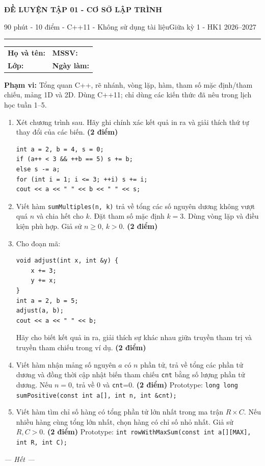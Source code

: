 \documentclass[11pt,a4paper]{article}
\newcommand{\examtitle}[4]{\begin{center}{\Large\bfseries\color{hcmusblue}#1}\par\vspace{3pt}{\large\bfseries #2}\par\vspace{3pt}\small #3\quad\textbullet\quad #4\end{center}\vspace{5pt}\hrule\vspace{8pt}}
\newcommand{\studentline}{\begin{tabularx}{\textwidth}{X X}\textbf{Họ và tên:} \hrulefill & \textbf{MSSV:} \hrulefill\\[7pt]\textbf{Lớp:} \hrulefill & \textbf{Ngày làm:} \hrulefill\end{tabularx}\vspace{8pt}}
\newcommand{\points}[1]{\hfill\textbf{(#1 điểm)}}
\begin{document}
\examtitle{ĐỀ LUYỆN TẬP 01 - CƠ SỞ LẬP TRÌNH}{CƠ SỞ LẬP TRÌNH - HCMUS (theo lịch học tuần 1--5)}{90 phút - 10 điểm - C++11 - Không sử dụng tài liệu}{Giữa kỳ 1 - HK1 2026--2027}

\studentline
\begin{notebox}\textbf{Phạm vi:} Tổng quan C++, rẽ nhánh, vòng lặp, hàm, tham số mặc định/tham chiếu, mảng 1D và 2D. Dùng C++11; chỉ dùng các kiến thức đã nêu trong lịch học tuần 1--5.\end{notebox}
\begin{enumerate}
\item Xét chương trình sau. Hãy ghi chính xác kết quả in ra và giải thích thứ tự thay đổi của các biến. \points{2}
\begin{lstlisting}
int a = 2, b = 4, s = 0;
if (a++ < 3 && ++b == 5) s += b;
else s -= a;
for (int i = 1; i <= 3; ++i) s += i;
cout << a << " " << b << " " << s;
\end{lstlisting}
\item Viết hàm \texttt{sumMultiples(n, k)} trả về tổng các số nguyên dương không vượt quá $n$ và chia hết cho $k$. Đặt tham số mặc định $k=3$. Dùng vòng lặp và điều kiện phù hợp. Giả sử $n\ge0$, $k>0$. \points{2}
\item Cho đoạn mã:
\begin{lstlisting}
void adjust(int x, int &y) {
    x += 3;
    y += x;
}
int a = 2, b = 5;
adjust(a, b);
cout << a << " " << b;
\end{lstlisting}
Hãy cho biết kết quả in ra, giải thích sự khác nhau giữa truyền tham trị và truyền tham chiếu trong ví dụ. \points{2}
\item Viết hàm nhận mảng số nguyên $a$ có $n$ phần tử, trả về tổng các phần tử dương và đồng thời cập nhật biến tham chiếu \texttt{cnt} bằng số lượng phần tử dương. Nếu $n=0$, trả về 0 và \texttt{cnt}=0. \points{2}
Prototype: \texttt{long long sumPositive(const int a[], int n, int \&cnt);}
\item Viết hàm tìm chỉ số hàng có tổng phần tử lớn nhất trong ma trận $R\times C$. Nếu nhiều hàng cùng tổng lớn nhất, chọn hàng có chỉ số nhỏ nhất. Giả sử $R,C>0$. \points{2}
Prototype: \texttt{int rowWithMaxSum(const int a[][MAX], int R, int C);}
\end{enumerate}
\vfill\begin{center}\textit{--- Hết ---}\end{center}
\end{document}

